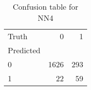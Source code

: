 \begin{table}[h!]
\caption{Confusion table for NN4}
\label{tab:NN4}
\begin{tabular}{lrr}
\toprule
Truth & 0 & 1 \\
Predicted &  &  \\
\midrule
0 & 1626 & 293 \\
1 & 22 & 59 \\
\bottomrule
\end{tabular}
\end{table}
